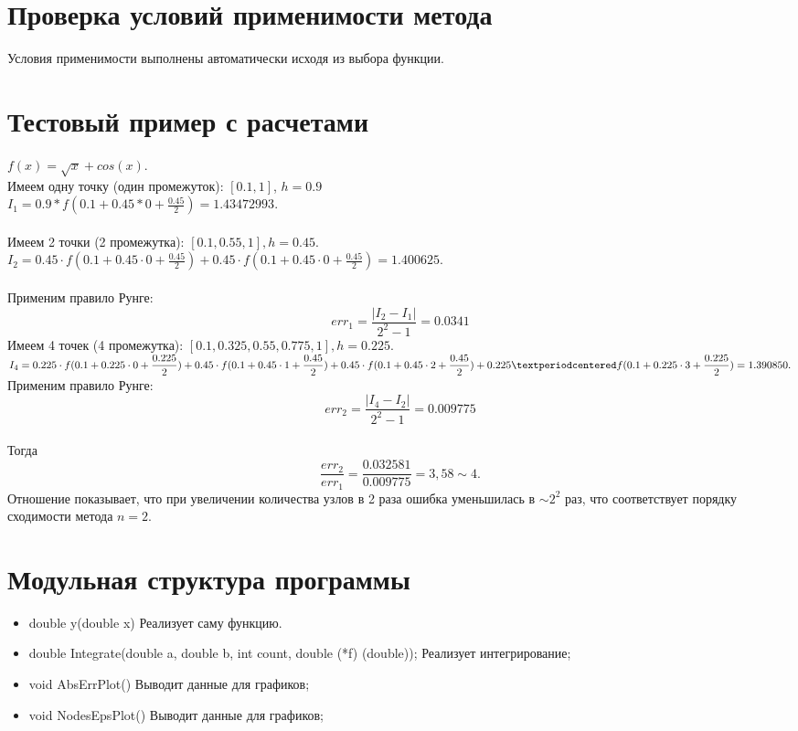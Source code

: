 \documentclass[12pt]{article}
\begin{document}
\section{Проверка условий применимости метода}
Условия применимости выполнены автоматически исходя из выбора функции.
\section{Тестовый пример с расчетами}
$f(x) = \sqrt{x} + cos(x)$.\\
Имеем одну точку (один промежуток): $[0.1, 1]$, $h = 0.9$\\
$I_1 = 0.9 * f(0.1 + 0.45 * 0 + \frac{0.45}{2}) = 1.43472993$.\\\\
Имеем 2 точки (2 промежутка): $[0.1, 0.55, 1], h = 0.45$.\\
$\displaystyle I_2 = 0.45\cdot f(0.1 + 0.45 \cdot 0 + \frac{0.45}{2}) + 0.45\cdot f(0.1 + 0.45 \cdot 0 + \frac{0.45}{2}) = 1.400625$.\\\\
Применим правило Рунге:
$$
err_1 = \frac{|I_2-I_1|}{2^2-1} =0.0341 
$$
Имеем 4 точек (4 промежутка): $[0.1, 0.325, 0.55, 0.775, 1], h = 0.225$.\\ 
$\displaystyle I_4 = 0.225\cdot f(0.1 + 0.225 \cdot  0 + \frac{0.225}{2}) + 0.45\cdot f(0.1 + 0.45 \cdot 1 + \frac{0.45}{2}) + 0.45\cdot f(0.1 + 0.45 \cdot 2 + \frac{0.45}{2}) + 0.225·f (0.1+0.225\cdot3+ \frac{0.225}{2}) = 1.390850.\\
$
Применим правило Рунге:\\
$$
err_2 = \frac{|I_4-I_2|}{2^2-1} =0.009775
$$\\
Тогда 
$$
\frac{err_2}{err_1} = \frac{0.032581}{0.009775} = 3,58 \sim 4.
$$
Отношение показывает, что при увеличении количества узлов в 2 раза ошибка уменьшилась в $\sim 2^2$ раз, что соответствует порядку сходимости метода $n = 2$.
\section{Модульная структура программы}
\begin{itemize}
    \item double y(double x) Реализует саму функцию.
    \item double Integrate(double a, double b, int count, double (*f) (double)); Реализует интегрирование;
    \item void AbsErrPlot() Выводит данные для графиков;
    \item void NodesEpsPlot() Выводит данные для графиков;
\end{itemize}
\end{document}
